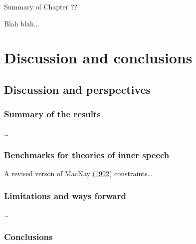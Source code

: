 \documentclass[a4paper,12pt,twoside,openright,oldfontcommands]{memoir}
\newcommand\getcurrentref[1]{
 \ifnumequal{\value{#1}}{0}
  {??}
  {\the\value{#1}}
}
\begin{document}
\newpage

\begin{vplace}[1]

\begin{summary}{Summary of Chapter\getcurrentref{chapter}}

Blah blah...

\end{summary}

\end{vplace}

\hypertarget{part-discussion-and-conclusions}{%
\part{Discussion and conclusions}\label{part-discussion-and-conclusions}}

\hypertarget{discussion-and-perspectives}{%
\chapter{Discussion and perspectives}\label{discussion-and-perspectives}}

\hypertarget{summary-of-the-results}{%
\section{Summary of the results}\label{summary-of-the-results}}

\ldots{}

\hypertarget{benchmarks-for-theories-of-inner-speech}{%
\section{Benchmarks for theories of inner speech}\label{benchmarks-for-theories-of-inner-speech}}

A revised verson of MacKay (\protect\hyperlink{ref-mackay_constraints_1992}{1992}) constraints\ldots{}

\hypertarget{limitations-and-ways-forward}{%
\section{Limitations and ways forward}\label{limitations-and-ways-forward}}

\ldots{}

\hypertarget{conclusions-1}{%
\section{Conclusions}\label{conclusions-1}}
\end{document}
